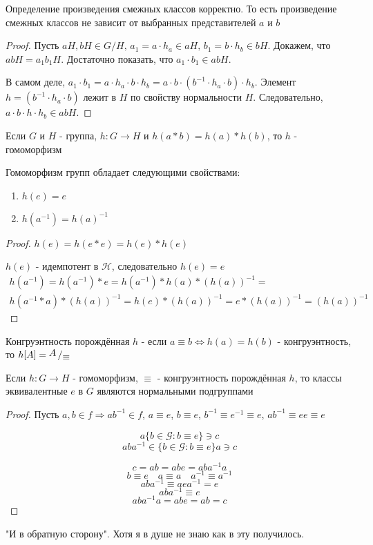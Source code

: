 \documentclass[../main/document.tex]{subfiles}
\begin{document}
\begin{thm}
Определение произведения смежных классов корректно. То есть произведение смежных классов не зависит от выбранных представителей $a$ и $b$
\begin{proof}
Пусть $aH,bH\in G/H,\,a_1=a\cdot h_a\in aH,\,b_1=b\cdot h_b\in bH$. Докажем, что $abH=a_1 b_1 H$. Достаточно показать, что $a_1\cdot b_1 \in abH$.

В самом деле, $a_1\cdot b_1=a\cdot h_a\cdot b\cdot h_b=a\cdot b\cdot (b^{-1}\cdot h_a\cdot b)\cdot h_b$. Элемент $h = (b^{-1}\cdot h_a\cdot b)$ лежит в $H$ по свойству нормальности $H$. Следовательно, $a\cdot b\cdot h\cdot h_b\in abH$.
\end{proof}
\end{thm}

\begin{dfn}
Если $G$ и $H$ - группа, $h:G\rightarrow H$ и $h(a*b)=h(a)*h(b)$, то $h$ - гомоморфизм
\end{dfn}
\begin{cnsq}\label{group-homomorphism-properties}
Гомоморфизм групп обладает следующими свойствами:
\begin{enumerate}
\item $h(e)=e$
\item $h(a^{-1})={h(a)}^{-1}$
\end{enumerate}
\begin{proof}
$h(e)=h(e*e)=h(e)*h(e)$

$h(e)$ - идемпотент в $\mathcal{H}$, следовательно $h(e)=e$
\begin{multline*}
h(a^{-1})=h(a^{-1})*e=h(a^{-1})*h(a)*(h(a))^{-1}=\\
h(a^{-1}*a)*(h(a))^{-1}=h(e)*(h(a))^{-1}=e*(h(a))^{-1}=(h(a))^{-1}
\end{multline*}
\end{proof}
\end{cnsq}

\begin{dfn}
Конгруэнтность порождённая $h$ - если $a\equiv b \Leftrightarrow h(a)=h(b)$ - конгруэнтность, то $h[A]= \bigslant{A}{\equiv}$ 
\end{dfn}

\begin{thm}
Если $h:G\rightarrow H$ - гомоморфизм, $\equiv$ - конгруэнтность порождённая $h$, то классы эквивалентные $e$ в $G$ являются нормальными подгруппами
\begin{proof}
Пусть $a,b\in f\Rightarrow ab^{-1}\in f$, $a\equiv e$, $b\equiv e$, $b^{-1}\equiv e^{-1}\equiv e$, $ab^{-1}\equiv ee\equiv e$

$$a\{b\in \mathcal{G}:b\equiv e\}\ni c$$
$$aba^{-1}\in\{b\in \mathcal{G}:b\equiv e\}a\ni c$$

$$c=ab=abe=aba^{-1}a$$
$$b\equiv e \quad a\equiv a\quad a^{-1}\equiv a^{-1}$$
$$aba^{-1}\equiv aea^{-1}=e$$
$$aba^{-1}\equiv e$$
$$aba^{-1}a=abe=ab=c$$
\end{proof}
"И в обратную сторону". Хотя я в душе не знаю как в эту получилось.
\end{thm}
\end{document}
